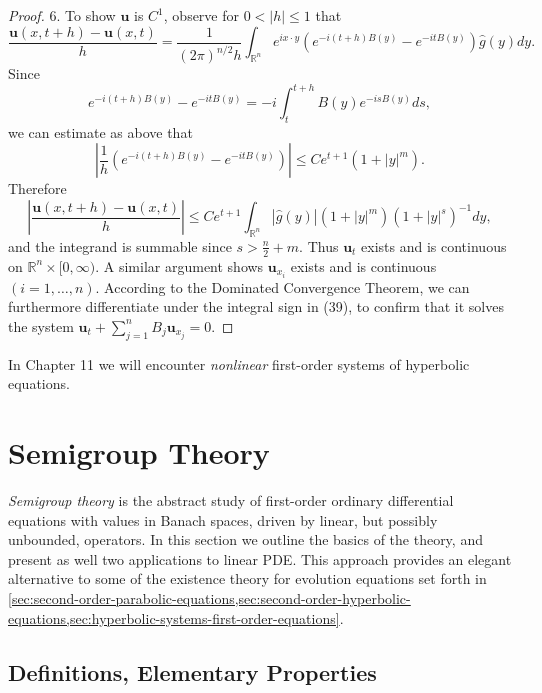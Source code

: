 \begin{proof}
6. To show $\mathbf{u}$ is $C^1$, observe for $0 < |h| \leq 1$ that
\[
\frac{\mathbf{u}(x, t+h) - \mathbf{u}(x,t)}{h} = \frac{1}{(2\pi)^{n/2} h} \int_{\mathbb{R}^n} e^{ix \cdot y}(e^{-i(t+h)B(y)} - e^{-itB(y)})\hat{g}(y) dy.
\]
Since
\[
e^{-i(t+h)B(y)} - e^{-itB(y)} = -i \int_t^{t+h} B(y)e^{-isB(y)} ds,
\]
we can estimate as above that
\[
\left|\frac{1}{h}(e^{-i(t+h)B(y)} - e^{-itB(y)})\right| \leq Ce^{t+1}(1 + |y|^m).
\]
Therefore
\[
\left|\frac{\mathbf{u}(x, t+h) - \mathbf{u}(x,t)}{h}\right| \leq Ce^{t+1} \int_{\mathbb{R}^n} |\hat{g}(y)|(1 + |y|^m)(1 + |y|^s)^{-1} dy,
\]
and the integrand is summable since $s > \frac{n}{2} + m$. Thus $\mathbf{u}_t$ exists and is continuous on $\mathbb{R}^n \times [0, \infty)$. A similar argument shows $\mathbf{u}_{x_i}$ exists and is continuous $(i = 1, \ldots, n)$. According to the Dominated Convergence Theorem, we can furthermore differentiate under the integral sign in (39), to confirm that it solves the system $\mathbf{u}_t + \sum_{j=1}^n B_j \mathbf{u}_{x_j} = 0$.
\end{proof}

In Chapter 11 we will encounter \textit{nonlinear} first-order systems of hyperbolic equations.

\section{Semigroup Theory}
\label{sec:semigroup-theory}

\textit{Semigroup theory} is the abstract study of first-order ordinary differential equations with values in Banach spaces, driven by linear, but possibly unbounded, operators. In this section we outline the basics of the theory, and present as well two applications to linear PDE. This approach provides an elegant alternative to some of the existence theory for evolution equations set forth in \cref{sec:second-order-parabolic-equations,sec:second-order-hyperbolic-equations,sec:hyperbolic-systems-first-order-equations}.

\subsection{Definitions, Elementary Properties}

